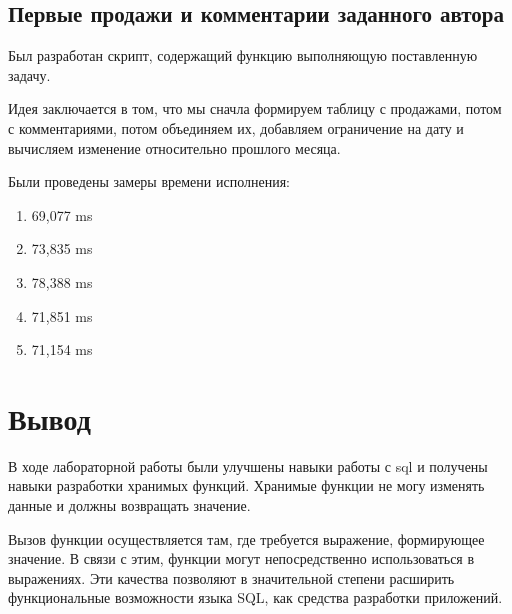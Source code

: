 \documentclass[a4paper,14pt]{extarticle}
\begin{document}
\subsection{Первые продажи и комментарии заданного автора}
Был разработан скрипт, содержащий функцию выполняющую поставленную задачу.



Идея заключается в том, что мы сначла формируем таблицу с продажами, потом с комментариями, потом объединяем их, добавляем ограничение на дату и вычисляем изменение относительно прошлого месяца.

Были проведены замеры времени исполнения:
\begin{enumerate}
	\item 69,077 ms
	\item 73,835 ms
	\item 78,388 ms
	\item 71,851 ms
	\item 71,154 ms
\end{enumerate}


\section{Вывод}
В ходе лабораторной работы были улучшены навыки работы с sql и получены навыки разработки хранимых функций. Хранимые функции не могу изменять данные и должны возвращать значение.

Вызов функции осуществляется там, где требуется выражение, формирующее значение. В связи с этим, функции могут непосредственно использоваться в выражениях. Эти качества позволяют в значительной степени расширить функциональные возможности языка SQL, как средства разработки приложений. 
\end{document}
